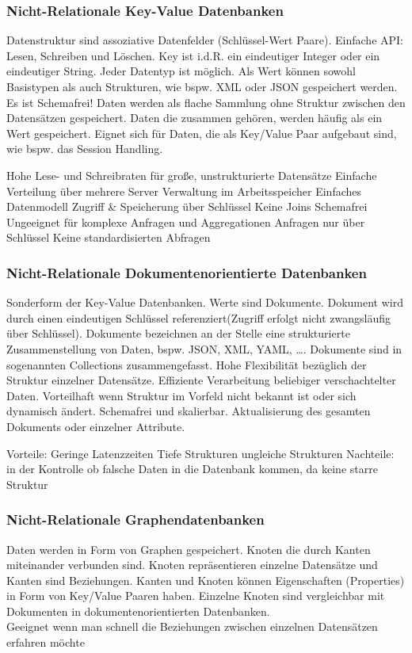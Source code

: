 \documentclass[12pt,a4paper]{article}
\begin{document}
\subsubsection{Nicht-Relationale Key-Value Datenbanken}
Datenstruktur sind assoziative Datenfelder (Schlüssel-Wert Paare). Einfache API: Lesen, Schreiben und Löschen. Key ist i.d.R. ein eindeutiger Integer oder ein eindeutiger String. Jeder Datentyp ist möglich. Als Wert können sowohl Basistypen als auch Strukturen, wie bspw. XML oder JSON gespeichert werden. Es ist Schemafrei! Daten werden als flache Sammlung ohne Struktur zwischen den Datensätzen gespeichert. Daten die zusammen gehören, werden häufig als ein Wert gespeichert. Eignet sich für Daten, die als Key/Value Paar aufgebaut sind, wie bspw. das Session Handling.
\begin{outline}
	\1 Hohe Lese- und Schreibraten für große, unstrukturierte Datensätze
		\2 Einfache Verteilung über mehrere Server
		\2 Verwaltung im Arbeitsspeicher
	\1 Einfaches Datenmodell
		\2 Zugriff \& Speicherung über Schlüssel
		\2 Keine Joins
		\2 Schemafrei
	\1 Ungeeignet für komplexe Anfragen und Aggregationen
		\2 Anfragen nur über Schlüssel 
		\2 Keine standardisierten Abfragen
\end{outline}

\subsubsection{Nicht-Relationale Dokumentenorientierte Datenbanken}
Sonderform der Key-Value Datenbanken. Werte sind Dokumente. Dokument wird durch einen eindeutigen Schlüssel referenziert(Zugriff erfolgt nicht zwangsläufig über Schlüssel). Dokumente bezeichnen an der Stelle eine strukturierte Zusammenstellung von Daten,
bspw. JSON, XML, YAML, \dots . Dokumente sind in sogenannten Collections zusammengefasst. Hohe Flexibilität bezüglich der Struktur einzelner Datensätze. Effiziente Verarbeitung beliebiger verschachtelter Daten. Vorteilhaft wenn Struktur im Vorfeld nicht bekannt ist oder sich dynamisch ändert. Schemafrei und skalierbar. Aktualisierung des gesamten Dokuments oder einzelner Attribute. 
\begin{outline}
	\1 Vorteile:
		\2 Geringe Latenzzeiten
		\2 Tiefe Strukturen
		\2 ungleiche Strukturen
	\1 Nachteile:
		\2  in der Kontrolle ob falsche Daten in die Datenbank kommen, da keine starre Struktur
\end{outline}

\subsubsection{Nicht-Relationale Graphendatenbanken}
Daten werden in Form von Graphen gespeichert. Knoten die durch Kanten miteinander verbunden sind. Knoten repräsentieren einzelne Datensätze und Kanten sind Beziehungen. Kanten und Knoten können Eigenschaften (Properties) in Form von Key/Value Paaren haben. Einzelne Knoten sind vergleichbar mit Dokumenten in dokumentenorientierten Datenbanken. \\
Geeignet wenn man schnell die Beziehungen zwischen einzelnen Datensätzen erfahren
möchte
\end{document}
